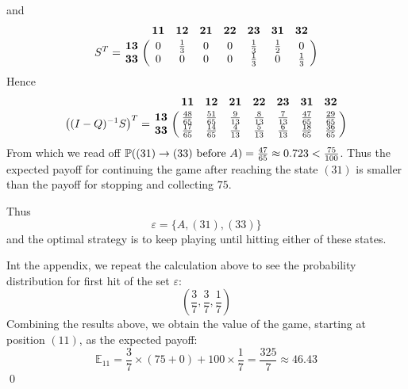 \documentclass[aps,prl,twocolumn,floatfix,letterpaper]{revtex4}
\newenvironment{solution}[1][Solution]{\begin{trivlist}
    \item[\hskip \labelsep {\bfseries #1}]}{\end{trivlist}}
\newcommand{\PP}{\mathbb{P}}
\newcommand{\EE}{\mathbb{E}}
\begin{document}
\begin{solution}
\begin{equation}
{}
\end{equation}
\normalsize
and
$$
S^T = \bordermatrix{
& \mathbf{11} & \mathbf{12} & \mathbf{21} & \mathbf{22} & \mathbf{23} & \mathbf{31} & \mathbf{32}\cr
\mathbf{13} & 0 & \frac{1}{3} & 0 & 0 & \frac{1}{3} & \frac{1}{2} & 0\cr 
\mathbf{33} & 0 & 0 & 0 & 0 & \frac{1}{3} & 0 & \frac{1}{3}
}
$$
Hence
\small
\begin{equation}
\left((I-Q)^{-1}S\right)^T = \bordermatrix{
& \mathbf{11} & \mathbf{12} & \mathbf{21} & \mathbf{22} & \mathbf{23} & \mathbf{31} & \mathbf{32}\cr
\mathbf{13} & \frac{48}{65} & \frac{51}{65} & \frac{9}{13} & \frac{8}{13} & \frac{7}{13} & \frac{47}{65} & \frac{29}{65}\cr 
\mathbf{33} & \frac{17}{65} & \frac{14}{65} & \frac{4}{13} & \frac{5}{13} & \frac{6}{13} & \frac{18}{65} & \frac{36}{65}
}
\end{equation}
\normalsize
From which we read off $\PP((31) \to (33) {\rm \ before\ } A) = \frac{47}{65} \approx 0.723 < \frac{75}{100}$.
Thus the expected payoff for continuing the game after reaching the state $(31)$ is smaller than the payoff 
for stopping and collecting $75$.

Thus \begin{equation} \varepsilon = \{A,(31),(33)\} \end{equation} and the optimal strategy 
is to keep playing until hitting either of these states.

Int the appendix, we repeat the calculation above to see the probability distribution for first hit of the set $\varepsilon$:
$$
  \left(\frac{3}{7},\frac{3}{7},\frac{1}{7}\right)
$$
Combining the results above, we obtain the value of the game, starting at position $(11)$, as 
the expected payoff:
$$ 
	\EE_{11} = \frac{3}{7}\times(75+0) + 100\times\frac{1}{7} = \frac{325}{7} \approx 46.43
$$
\qed
\end{solution}

\appendix
%
%
\end{document}
